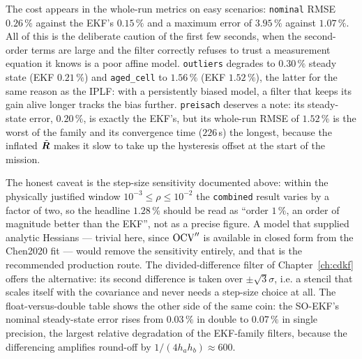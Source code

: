 The cost appears in the whole-run metrics on easy scenarios: \texttt{nominal} RMSE $0.26\,\%$
against the EKF's $0.15\,\%$ and a maximum error of $3.95\,\%$ against $1.07\,\%$. All of this
is the deliberate caution of the first few seconds, when the second-order terms are large and
the filter correctly refuses to trust a measurement equation it knows is a poor affine model.
\texttt{outliers} degrades to $0.30\,\%$ steady state (EKF $0.21\,\%$) and \texttt{aged\_cell}
to $1.56\,\%$ (EKF $1.52\,\%$), the latter for the same reason as the IPLF: with a persistently
biased model, a filter that keeps its gain alive longer tracks the bias further.
\texttt{preisach} deserves a note: its steady-state error, $0.20\,\%$, is exactly the EKF's,
but its whole-run RMSE of $1.52\,\%$ is the worst of the family and its convergence time
($226$\,s) the longest, because the inflated $\tilde{\bm{R}}$ makes it slow to take up the
hysteresis offset at the start of the mission.

The honest caveat is the step-size sensitivity documented above: within the physically
justified window $10^{-3}\le\rho\le10^{-2}$ the \texttt{combined} result varies by a factor of
two, so the headline $1.28\,\%$ should be read as ``order $1\,\%$, an order of magnitude better
than the EKF'', not as a precise figure. A model that supplied analytic Hessians --- trivial
here, since $\mathrm{OCV}''$ is available in closed form from the Chen2020 fit --- would remove the
sensitivity entirely, and that is the recommended production route. The divided-difference
filter of Chapter~\ref{ch:cdkf} offers the alternative: its second difference is taken over
$\pm\sqrt3\sigma$, i.e. a stencil that scales itself with the covariance and never needs a
step-size choice at all. The float-versus-double table shows the other side of the same coin:
the SO-EKF's nominal steady-state error rises from $0.03\,\%$ in double to $0.07\,\%$ in
single precision, the largest relative degradation of the EKF-family filters, because the
differencing amplifies round-off by $1/(4h_ah_b)\approx600$.

